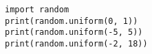 %
%
\begin {lstlisting}
import random
print(random.uniform(0, 1))
print(random.uniform(-5, 5))
print(random.uniform(-2, 18))
\end{lstlisting}
